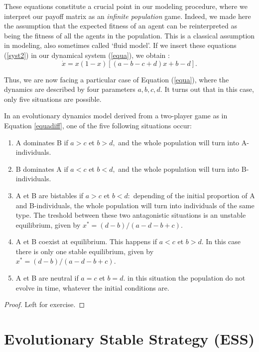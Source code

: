 These equations constitute a crucial point in our modeling procedure, where we interpret our payoff matrix as an \emph{infinite population} game.  Indeed, we made here the assumption that the expected fitness of an agent can be reinterpreted as being the fitness of all the agents in the population.  This is a classical assumption in modeling, also sometimes called `fluid model'.
If we insert these equations (\ref{syst2}) in our dynamical system  (\ref{equa}), we obtain :
\begin{equation}
\dot{x} = x(1-x) \left[ (a-b-c+d)x+b-d\right]. \label{equadiff}
\end{equation}

Thus, we are now facing a particular case of Equation (\ref{equa}), where the dynamics are described by four parameters $a,b,c,d.$
It turns out that in this case, only five situations are possible.
\begin{theorem}
In an evolutionary dynamics model derived from a two-player game as in Equation \eqref{equadiff}, one of the five following situations occur:
\begin{enumerate}
\item A dominates B if $a>c$ et $b>d,$ and the whole population will turn into A-individuals.
\item B dominates A if $a<c$ et $b<d,$ and the whole population will turn into B-individuals.
\item A et B are bistables if $a>c$ et $b<d:$ depending of the initial proportion of A and B-individuals, the whole population will turn into individuals of the same type. The treshold between these two antagonistic situations is an unstable equilibrium, given by $x^*=(d-b)/(a-d-b+c).$
\item A et B coexist at equilibrium.  This happens if $a<c$ et $b>d.$  In this case there is only one stable equilibrium, given by $x^*=(d-b)/(a-d-b+c).$
\item A et B are neutral if $a=c$ et $b=d.$ in this situation the population do not evolve in time, whatever the initial conditions are.
\end{enumerate}
\end{theorem}
\begin{proof}
Left for exercise.
\end{proof}

\section{Evolutionary Stable Strategy (ESS)}

